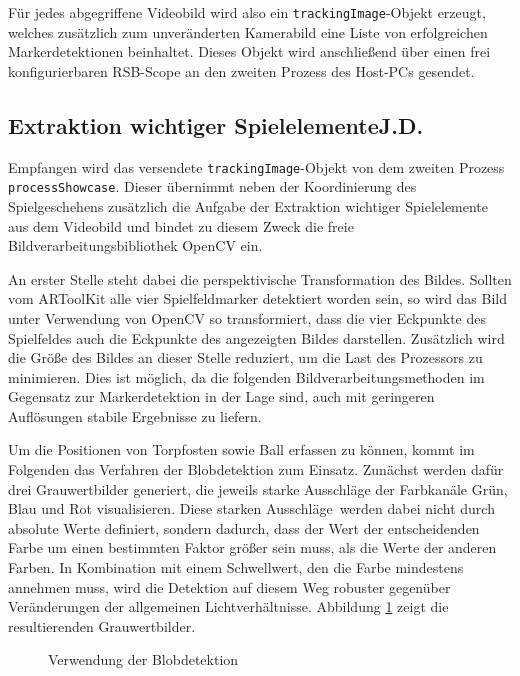 Für jedes abgegriffene Videobild wird also ein \texttt{trackingImage}-Objekt erzeugt, welches zusätzlich zum unveränderten Kamerabild eine Liste von erfolgreichen Markerdetektionen beinhaltet. Dieses Objekt wird anschließend über einen frei konfigurierbaren RSB-Scope an den zweiten Prozess des Host-PCs gesendet.

\subsection[Extraktion wichtiger Spielelemente]{Extraktion wichtiger Spielelemente\hfill {\normalsize J.D.}} %

Empfangen wird das versendete \texttt{trackingImage}-Objekt von dem zweiten Prozess \texttt{processShowcase}. Dieser übernimmt neben der Koordinierung des Spielgeschehens zusätzlich die Aufgabe der Extraktion wichtiger Spielelemente aus dem Videobild und bindet zu diesem Zweck die freie Bildverarbeitungsbibliothek OpenCV ein.

An erster Stelle steht dabei die perspektivische Transformation des Bildes. Sollten vom ARToolKit alle vier Spielfeldmarker detektiert worden sein, so wird das Bild unter Verwendung von OpenCV so transformiert, dass die vier Eckpunkte des Spielfeldes auch die Eckpunkte des angezeigten Bildes darstellen. Zusätzlich wird die Größe des Bildes an dieser Stelle reduziert, um die Last des Prozessors zu minimieren. Dies ist möglich, da die folgenden Bildverarbeitungsmethoden im Gegensatz zur Markerdetektion in der Lage sind, auch mit  geringeren Auflösungen stabile Ergebnisse zu liefern.

Um die Positionen von Torpfosten sowie Ball erfassen zu können, kommt im Folgenden das Verfahren der Blobdetektion zum Einsatz. Zunächst werden dafür drei Grauwertbilder generiert, die jeweils starke Ausschläge der Farbkanäle Grün, Blau und Rot visualisieren. Diese \glqq starken Ausschläge\grqq~werden dabei nicht durch absolute Werte definiert, sondern dadurch, dass der Wert der entscheidenden Farbe um einen bestimmten Faktor größer sein muss, als die Werte der anderen Farben. In Kombination mit einem Schwellwert, den die Farbe mindestens annehmen muss, wird die Detektion auf diesem Weg robuster gegenüber Veränderungen der allgemeinen Lichtverhältnisse. Abbildung \ref{fig:blob} zeigt die resultierenden Grauwertbilder.

\begin{figure}
	\begin{center}
		\caption{Verwendung der Blobdetektion}
		\label{fig:blob}
	\end{center}
\end{figure}


